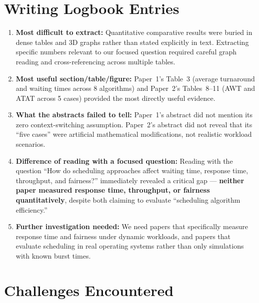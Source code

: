 \documentclass[11pt, a4paper]{article}
\begin{document}
\section{Writing Logbook Entries}

\begin{enumerate}[nosep]
    \item \textbf{Most difficult to extract:} Quantitative comparative results were buried in dense tables and 3D graphs rather than stated explicitly in text. Extracting specific numbers relevant to our focused question required careful graph reading and cross-referencing across multiple tables.
    
    \item \textbf{Most useful section/table/figure:} Paper~1's Table~3 (average turnaround and waiting times across 8 algorithms) and Paper~2's Tables~8--11 (AWT and ATAT across 5 cases) provided the most directly useful evidence.
    
    \item \textbf{What the abstracts failed to tell:} Paper~1's abstract did not mention its zero context-switching assumption. Paper~2's abstract did not reveal that its ``five cases'' were artificial mathematical modifications, not realistic workload scenarios.
    
    \item \textbf{Difference of reading with a focused question:} Reading with the question ``How do scheduling approaches affect waiting time, response time, throughput, and fairness?'' immediately revealed a critical gap --- \textbf{neither paper measured response time, throughput, or fairness quantitatively}, despite both claiming to evaluate ``scheduling algorithm efficiency.''
    
    \item \textbf{Further investigation needed:} We need papers that specifically measure response time and fairness under dynamic workloads, and papers that evaluate scheduling in real operating systems rather than only simulations with known burst times.
\end{enumerate}

\section{Challenges Encountered}
\end{document}
